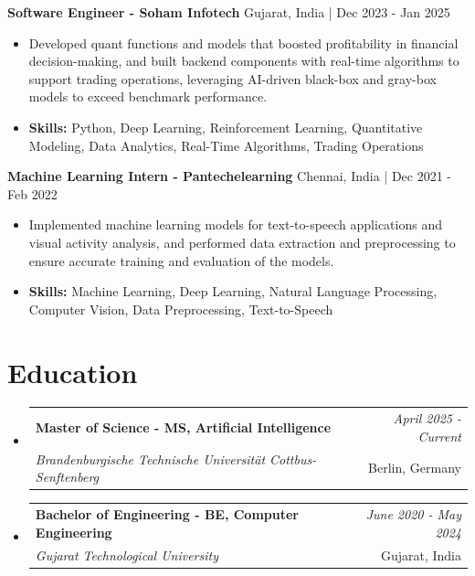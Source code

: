 \documentclass[a4paper,11pt]{article}
\makeatletter
\newcommand{\resumeSubheading}[4]{
\vspace{0.5mm}\item
    \begin{tabular*}{\linewidth}[t]{l@{\extracolsep{\fill}}r}
        \textbf{#1} & \textit{\footnotesize{#4}} \\
        \textit{\footnotesize{#3}} &  \footnotesize{#2}\\
    \end{tabular*}
    \vspace{-2.4mm}
}
\makeatother
\begin{document}
\vspace{1mm}
  \textbf{Software Engineer - Soham Infotech} \hfill Gujarat, India | Dec 2023 - Jan 2025
\vspace{-1.5mm} %
\begin{itemize}
  \item Developed quant functions and models that boosted profitability in financial decision-making, and built backend components with real-time algorithms to support trading operations, leveraging AI-driven black-box and gray-box models to exceed benchmark performance.

\vspace{-2mm}
  \item \textbf{Skills:} Python, Deep Learning, Reinforcement Learning, Quantitative Modeling, Data Analytics, Real-Time Algorithms, Trading Operations
\end{itemize}

\vspace{1mm}
  \textbf{Machine Learning Intern - Pantechelearning} \hfill Chennai, India | Dec 2021 - Feb 2022
\vspace{-1.5mm} %
\begin{itemize}
  \item Implemented machine learning models for text-to-speech applications and visual activity analysis, and performed data extraction and preprocessing to ensure accurate training and evaluation of the models.
\vspace{-2mm}
  \item \textbf{Skills:} Machine Learning, Deep Learning, Natural Language Processing, Computer Vision, Data Preprocessing, Text-to-Speech
\end{itemize}\section{\textbf{Education}}
\vspace{-0.4mm}

\begin{itemize}[leftmargin=0.15in, label={}]
\resumeSubheading
{Master of Science - MS, Artificial Intelligence }{Berlin, Germany}
{Brandenburgische Technische Universität Cottbus-Senftenberg  }{April 2025 - Current}

\vspace{1.0mm} %
\resumeSubheading
{Bachelor of Engineering - BE, Computer Engineering  }{Gujarat, India}
{Gujarat Technological University }{June 2020 - May 2024}

\end{itemize}
\end{document}
